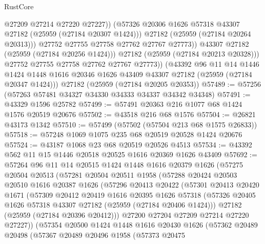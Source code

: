 \begin{lexlean}{RustCore}
\begin{coremodule}
                      @27209
                      @27214
                      @27220
                      @27227))
                  (@57326 @20306 @1626 @57318 @43307 @27182 (@25959 (@27184 @20307 @1424)))
                  @27182
                  (@25959 (@27184 @20264 @20313)))
                @27752
                @27755
                @27758
                @27762
                @27767
                @27773))
            @43307
            @27182
            (@25959 (@27184 @20256 @1424)))
          @27182
          (@25959 (@27184 @20213 @20328)))
        @27752
        @27755
        @27758
        @27762
        @27767
        @27773))
    (@43392
      @96
      @11
      @14
      @1446
      @1424
      @1448
      @1616
      @20346
      @1626
      @43409
      @43307
      @27182
      (@25959 (@27184 @20347 @1424)))
    @27182
    (@25959 (@27184 @20205 @20353))
@57489 := @57256 (@57263 @57481 @34327 @34330 @34333 @34337 @34342 @34348)
@57491 := @43329 @1596 @25782
@57499 := @57491 @20363 @216 @1077 @68 @1424 @1576 @20519 @20676
@57502 := @43518 @216 @68 @1576
@57504 := @26821 @43173 @1342
@57510 := @57499 (@57502 (@57504 @213 @68 @1575 @26833))
@57518 := @57248 @1069 @1075 @235 @68 @20519 @20528 @1424 @20676
@57524 := @43187 @1068 @23 @68 @20519 @20526 @4513
@57534 := @43392 @562 @11 @15 @1446 @20518 @20525 @1616 @20369 @1626 @43409
@57692 := @57264
    @96
    @11
    @14
    @20515
    @1424
    @1448
    @1616
    @20379
    @1626
    (@57275
      @20504
      @20513
      (@57281
        @20504
        @20511
        @1958
        (@57288
          @20424
          @20503
          @20510
          @1616
          @20387
          @1626
          (@57296
            @20413
            @20422
            (@57301
              @20413
              @20420
              @1671
              (@57309
                @20412
                @20419
                @1616
                @20395
                @1626
                @57318
                (@57326 @20405 @1626 @57318 @43307 @27182 (@25959 (@27184 @20406 @1424)))
                @27182
                (@25959 (@27184 @20396 @20412)))
              @27200
              @27204
              @27209
              @27214
              @27220
              @27227))
          (@57354
            @20500
            @1424
            @1448
            @1616
            @20430
            @1626
            (@57362
              @20489
              @20498
              (@57367
                @20489
                @20496
                @1958
                (@57373
                  @20475

\end{coremodule}
\end{lexlean}
